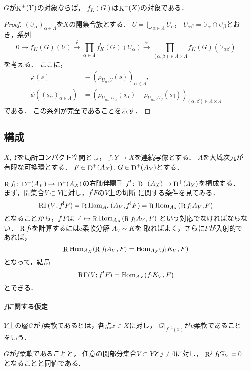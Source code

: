 \begin{LMM}\cite[{VI. Th\'eor\`eme 3.5}]{B+84}
    \(G\)が\(\mathop{\mathrm{K}}\nolimits^+(Y)\)の対象ならば，
    \(f^!_K(G)\)は\(\mathop{\mathrm{K}}\nolimits^+(X)\)の対象である．
\end{LMM}
\begin{proof}
    \((U_\alpha)_{\alpha\in{\Lambda}}\)を\(X\)の開集合族とする．
    \(U=\bigcup_{\alpha\in\Lambda}U_\alpha\)，
    \(U_{\alpha\beta}=U_\alpha\cap U_\beta\)とおき，系列
    \[
        0\to f^!_K(G)(U)
        \overset{\varphi}{\longrightarrow}
        \prod_{\alpha\in\Lambda}^{}f^!_K(G)(U_\alpha)
        \overset{\psi}{\longrightarrow}
        \prod_{(\alpha,\beta)\in\Lambda\times\Lambda}f^!_K(G)(U_{\alpha\beta})
    \]
    を考える．
    ここに，\begin{align*}
        \varphi(s)&=\left(\rho_{U_\alpha,U}(s)\right)_{\alpha\in\Lambda},\\
        \psi\left(\left(s_\alpha\right)_{\alpha\in\Lambda}\right)
        &=\left(
            \rho_{U_{\alpha\beta},U_{\alpha}}\left(s_\alpha\right)
            -
            \rho_{U_{\alpha\beta},U_{\beta}}\left(s_\beta\right)
        \right)_{(\alpha,\beta)\in\Lambda\times\Lambda}
    \end{align*}である．
    この系列が完全であることを示す．

\end{proof}


\subsection{構成}

\(X\), \(Y\)を局所コンパクト空間とし，
\(f\colon{Y}\to{X}\)を連続写像とする．
\(A\)を大域次元が有限な可換環とする．
\(F\in\mathop{\mathrm{D}}\nolimits^+(A_X)\), \(G\in\mathop{\mathrm{D}}\nolimits^+(A_Y)\)とする．

\(\mathop{\mathrm{R}}\nolimits{f_!}\colon\mathop{\mathrm{D}}\nolimits^+(A_Y)\to\mathop{\mathrm{D}}\nolimits^+(A_X)\)の右随伴関手
\(f^!\colon\mathop{\mathrm{D}}\nolimits^+(A_X)\to\mathop{\mathrm{D}}\nolimits^+(A_Y)\)を構成する．
まず，開集合\(V\subset Y\)に対し，\(f^!{F}\)の\(V\)上の切断
に関する条件を見てみる．
\[
    \mathop{\mathrm{R}\hspace{-0pt}\Gamma}\nolimits(V;f^!{F})
    =\mathop{\mathrm{R}}\nolimits\mathop{\mathrm{Hom}}\nolimits_{A_Y}(A_V,f^!F)
    =\mathop{\mathrm{R}}\nolimits\mathop{\mathrm{Hom}}\nolimits_{A_X}(\mathop{\mathrm{R}}\nolimits{f_!}A_V,F)
\]
となることから，\(f^!F\)は
\(V\mapsto\mathop{\mathrm{R}}\nolimits\mathop{\mathrm{Hom}}\nolimits_{A_X}(\mathop{\mathrm{R}}\nolimits{f_!}A_V,F)\)
という対応でなければならない．
\(\mathop{\mathrm{R}}\nolimits{f_!}\)を計算するにはc柔軟分解
\(A_V\sim K\)を
取ればよく，さらに\(F\)が入射的であれば，
\[
    \mathop{\mathrm{R}}\nolimits\mathop{\mathrm{Hom}}\nolimits_{A_X}(\mathop{\mathrm{R}}\nolimits{f_!}A_V,F)
    =\mathop{\mathrm{Hom}}\nolimits_{A_X}({f_!}K_V,F)
\]
となって，結局
\[
    \mathop{\mathrm{R}\hspace{-0pt}\Gamma}\nolimits(V;f^!{F})
    =\mathop{\mathrm{Hom}}\nolimits_{A_X}({f_!}K_V,F)
\]
とできる．

\paragraph{\(f\)に関する仮定}
\begin{DFN}
    \(Y\)上の層\(G\)が\(f\)柔軟であるとは，各点\(x\in{X}\)に対し，
    \(G\rvert_{f^{-1}(x)}\)がc柔軟であることをいう．
\end{DFN}
\(G\)が\(f\)柔軟であることと，
任意の開部分集合\(V\subset{Y}\)と\(j\ne0\)に対し，
\(\mathop{\mathrm{R}}\nolimits^jf_!G_V=0\)となることと同値である．

